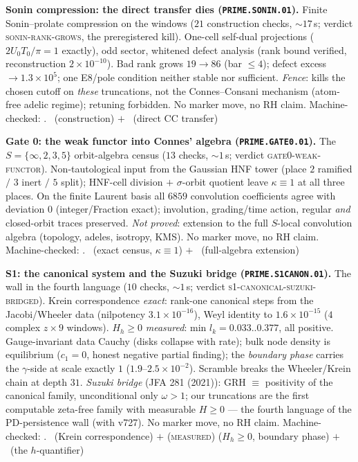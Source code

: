 \documentclass[11pt,a4paper]{article}
\theoremstyle{definition}
\begin{document}
\par\smallskip\noindent\textbf{Sonin compression: the direct
transfer dies (\texttt{PRIME.SONIN.01}).}
Finite Sonin--prolate compression on the windows ($21$ construction
checks, ${\sim}17$\,s; verdict \textsc{sonin-rank-grows}, the
preregistered kill).  One-cell self-dual projections
($2U_0T_0/\pi=1$ exactly), odd sector, whitened defect analysis
(rank bound verified, reconstruction $2\times10^{-10}$).  Bad rank
grows $19\to86$ (bar $\le4$); defect excess $\to1.3\times10^{5}$;
one E8/pole condition neither stable nor sufficient.  \emph{Fence}:
kills the chosen cutoff on \emph{these} truncations, not the
Connes--Consani mechanism (atom-free adelic regime); retuning
forbidden.  No marker move, no RH claim.
Machine-checked: .
\mE\ (construction) $+$ \mX\ (direct CC transfer)
\par\smallskip

\par\smallskip\noindent\textbf{Gate 0: the weak functor into
Connes' algebra (\texttt{PRIME.GATE0.01}).}
The $S=\{\infty,2,3,5\}$ orbit-algebra census ($13$ checks,
${\sim}1$\,s; verdict \textsc{gate0-weak-functor}).  Non-tautological
input from the Gaussian HNF tower (place $2$ ramified $/$ $3$ inert
$/$ $5$ split); HNF-cell division $+$ $\sigma$-orbit quotient leave
$\kappa\equiv1$ at all three places.  On the finite Laurent basis
all $6859$ convolution coefficients agree with deviation $0$
(integer/Fraction exact); involution, grading/time action, regular
\emph{and} closed-orbit traces preserved.  \emph{Not proved}:
extension to the full $S$-local convolution algebra (topology,
adeles, isotropy, KMS).  No marker move, no RH claim.
Machine-checked: .
\mE\ (exact census, $\kappa\equiv1$) $+$ \mO\ (full-algebra
extension)
\par\smallskip

\par\smallskip\noindent\textbf{S1: the canonical system and the
Suzuki bridge (\texttt{PRIME.S1CANON.01}).}
The wall in the fourth language ($10$ checks, ${\sim}1$\,s; verdict
\textsc{s1-canonical-suzuki-bridged}).  Krein correspondence
\emph{exact}: rank-one canonical steps from the Jacobi/Wheeler data
(nilpotency $3.1\times10^{-16}$), Weyl identity to
$1.6\times10^{-15}$ ($4$ complex $z\times9$ windows).  $H_h\ge0$
\emph{measured}: min $l_k=0.033..0.377$, all positive.
Gauge-invariant data Cauchy (disks collapse with rate); bulk node
density is equilibrium ($c_1=0$, honest negative partial finding);
the \emph{boundary phase} carries the $\gamma$-side at scale
exactly $1$ ($1.9$--$2.5\times10^{-2}$).  Scramble breaks the
Wheeler/Krein chain at depth $31$.  \emph{Suzuki bridge} (JFA 281
(2021)): GRH $\equiv$ positivity of the canonical family,
unconditional only $\omega>1$; our truncations are the first
computable zeta-free family with measurable $H\ge0$ --- the fourth
language of the PD-persistence wall (with v727).  No marker move,
no RH claim.
Machine-checked: .
\mE\ (Krein correspondence) $+$ (\textsc{measured}) ($H_h\ge0$,
boundary phase) $+$ \mO\ (the $h$-quantifier)
\par\smallskip
\end{document}

